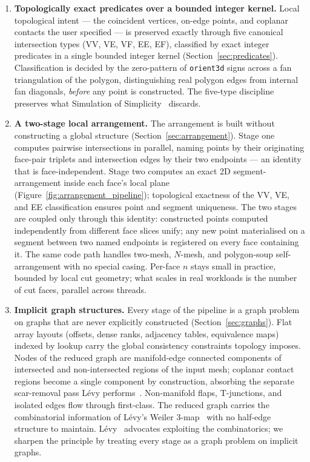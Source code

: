 \documentclass{egpubl}
\begin{document}
\begin{enumerate}
\item \textbf{Topologically exact predicates over a bounded integer kernel.}
Local topological intent --- the coincident vertices, on-edge points, and coplanar contacts the user specified --- is preserved exactly through five canonical intersection types (VV, VE, VF, EE, EF), classified by exact integer predicates in a single bounded integer kernel (Section~\ref{sec:predicates}). Classification is decided by the zero-pattern of \texttt{orient3d} signs across a fan triangulation of the polygon, distinguishing real polygon edges from internal fan diagonals, \emph{before} any point is constructed. The five-type discipline preserves what Simulation of Simplicity~\cite{EdelsbrunnerMucke1990} discards.

\item \textbf{A two-stage local arrangement.}
The arrangement is built without constructing a global structure (Section~\ref{sec:arrangement}). Stage one computes pairwise intersections in parallel, naming points by their originating face-pair triplets and intersection edges by their two endpoints --- an identity that is face-independent. Stage two computes an exact 2D segment-arrangement inside each face's local plane (Figure~\ref{fig:arrangement_pipeline}); topological exactness of the VV, VE, and EE classification ensures point and segment uniqueness. The two stages are coupled only through this identity: constructed points computed independently from different face slices unify; any new point materialised on a segment between two named endpoints is registered on every face containing it. The same code path handles two-mesh, $N$-mesh, and polygon-soup self-arrangement with no special casing. Per-face $n$ stays small in practice, bounded by local cut geometry; what scales in real workloads is the number of cut faces, parallel across threads.

\item \textbf{Implicit graph structures.}
Every stage of the pipeline is a graph problem on graphs that are never explicitly constructed (Section~\ref{sec:graphs}). Flat array layouts (offsets, dense ranks, adjacency tables, equivalence maps) indexed by lookup carry the global consistency constraints topology imposes. Nodes of the reduced graph are manifold-edge connected components of intersected and non-intersected regions of the input mesh; coplanar contact regions become a single component by construction, absorbing the separate scar-removal pass L\'evy performs~\cite{Levy2025}. Non-manifold flaps, T-junctions, and isolated edges flow through first-class. The reduced graph carries the combinatorial information of L\'evy's Weiler 3-map~\cite{Weiler1985} with no half-edge structure to maintain. L\'evy~\cite{Levy2025} advocates exploiting the combinatorics; we sharpen the principle by treating every stage as a graph problem on implicit graphs.


\end{enumerate}
\end{document}
